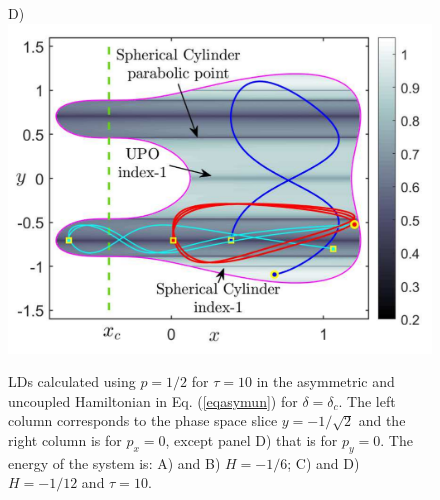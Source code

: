 \documentclass[10pt,aps,onecolumn,superscriptaddress]{revtex4-2}
\begin{document}
\begin{figure}[htbp]
\begin{center}
		D)\includegraphics[scale=0.27]{LD_tau_10_py_0_delta_bif_H_-1div12}
	\end{center}
	\caption{LDs calculated using $p = 1/2$ for $\tau = 10$ in the asymmetric and uncoupled Hamiltonian in Eq. (\ref{eqasymun}) for $\delta = \delta_c$. The left column corresponds to the phase space slice $y = -1/\sqrt{2}$ and the right column is for $p_x = 0$, except panel D) that is for $p_y = 0$. The energy of the system is: A) and B) $H = -1/6$; C) and D) $H = -1/12$ and $\tau = 10$.}\label{LD_delta_crit}
\end{figure}


\end{document}
